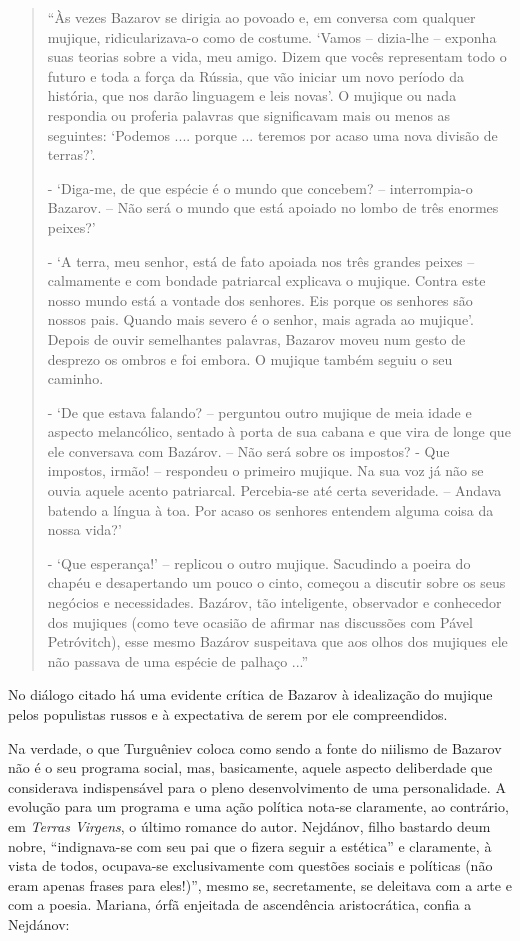 \begin{quote}
``Às vezes Bazarov se dirigia ao povoado e, em conversa com qualquer
mujique, ridicularizava-o como de costume. `Vamos -- dizia-lhe --
exponha suas teorias sobre a vida, meu amigo. Dizem que vocês
representam todo o futuro e toda a força da Rússia, que vão iniciar um
novo período da história, que nos darão linguagem e leis novas'. O
mujique ou nada respondia ou proferia palavras que significavam mais ou
menos as seguintes: `Podemos .... porque ... teremos por acaso uma nova
divisão de terras?'.

- `Diga-me, de que espécie é o mundo que concebem? -- interrompia-o
Bazarov. -- Não será o mundo que está apoiado no lombo de três enormes
peixes?'

- `A terra, meu senhor, está de fato apoiada nos três grandes peixes --
calmamente e com bondade patriarcal explicava o mujique. Contra este
nosso mundo está a vontade dos senhores. Eis porque os senhores são
nossos pais. Quando mais severo é o senhor, mais agrada ao mujique'.
Depois de ouvir semelhantes palavras, Bazarov moveu num gesto de
desprezo os ombros e foi embora. O mujique também seguiu o seu caminho.

- `De que estava falando? -- perguntou outro mujique de meia idade e
aspecto melancólico, sentado à porta de sua cabana e que vira de longe
que ele conversava com Bazárov. -- Não será sobre os impostos? - Que
impostos, irmão! -- respondeu o primeiro mujique. Na sua voz já não se
ouvia aquele acento patriarcal. Percebia-se até certa severidade. --
Andava batendo a língua à toa. Por acaso os senhores entendem alguma
coisa da nossa vida?'

- `Que esperança!' -- replicou o outro mujique. Sacudindo a poeira do
chapéu e desapertando um pouco o cinto, começou a discutir sobre os seus
negócios e necessidades. Bazárov, tão inteligente, observador e
conhecedor dos mujiques (como teve ocasião de afirmar nas discussões com
Pável Petróvitch), esse mesmo Bazárov suspeitava que aos olhos dos
mujiques ele não passava de uma espécie de palhaço ...''
\end{quote}

No diálogo citado há uma evidente crítica de Bazarov à idealização do
mujique pelos populistas russos e à expectativa de serem por ele
compreendidos.

Na verdade, o que Turguêniev coloca como sendo a fonte do niilismo de
Bazarov não é o seu programa social, mas, basicamente, aquele aspecto
deliberdade que considerava indispensável para o pleno desenvolvimento
de uma personalidade. A evolução para um programa e uma ação política
nota-se claramente, ao contrário, em \emph{Terras Virgens}, o último
romance do autor. Nejdánov, filho bastardo deum nobre, ``indignava-se
com seu pai que o fizera seguir a estética'' e claramente, à vista de
todos, ocupava-se exclusivamente com questões sociais e políticas (não
eram apenas frases para eles!)'', mesmo se, secretamente, se deleitava
com a arte e com a poesia. Mariana, órfã enjeitada de ascendência
aristocrática, confia a Nejdánov:

